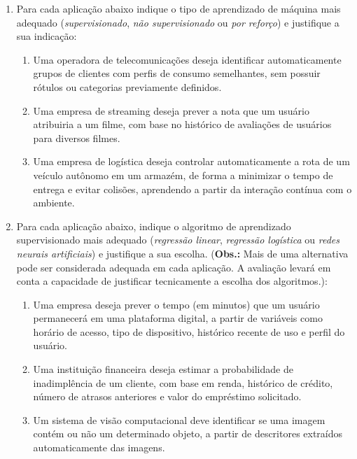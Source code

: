 \documentclass[9pt,a4paper]{extarticle}
\begin{document}
\begin{enumerate}[label=\textbf{\arabic*)}, itemsep=1.3em]
\item Para cada aplicação abaixo indique o tipo de aprendizado de máquina mais adequado (\emph{supervisionado}, \emph{não supervisionado} ou \emph{por reforço}) e justifique a sua indicação:

\begin{enumerate}[label=(\alph*)]
    \item Uma operadora de telecomunicações deseja identificar automaticamente grupos de clientes com perfis de consumo semelhantes, sem possuir rótulos ou categorias previamente definidos.

    \item Uma empresa de streaming deseja prever a nota que um usuário atribuiria a um filme, com base no histórico de avaliações de usuários para diversos filmes.
    
    \item Uma empresa de logística deseja controlar automaticamente a rota de um veículo autônomo em um armazém, de forma a minimizar o tempo de entrega e evitar colisões, aprendendo a partir da interação contínua com o ambiente.
\end{enumerate}

\item Para cada aplicação abaixo, indique o algoritmo de aprendizado supervisionado mais adequado 
(\emph{regressão linear}, \emph{regressão logística} ou \emph{redes neurais artificiais}) 
e justifique a sua escolha. (\textbf{Obs.:} Mais de uma alternativa pode ser considerada adequada em cada aplicação. A avaliação levará em conta a capacidade de justificar tecnicamente a escolha dos algoritmos.):

\begin{enumerate}[label=(\alph*)]
    \item Uma empresa deseja prever o tempo (em minutos) que um usuário permanecerá em uma plataforma digital, a partir de variáveis como horário de acesso, tipo de dispositivo, histórico recente de uso e perfil do usuário.
    
    \item Uma instituição financeira deseja estimar a probabilidade de inadimplência de um cliente, com base em renda, histórico de crédito, número de atrasos anteriores e valor do empréstimo solicitado.
    
    \item Um sistema de visão computacional deve identificar se uma imagem contém ou não um determinado objeto, a partir de descritores extraídos automaticamente das imagens.
\end{enumerate}



\end{enumerate}
\end{document}
